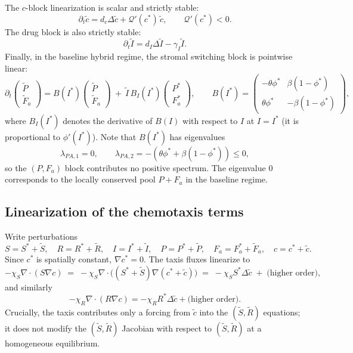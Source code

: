 \documentclass[pdflatex,sn-mathphys-ay]{sn-jnl}
\theoremstyle{thmstyleone}
\theoremstyle{definition}
\theoremstyle{remark}
\begin{document}
\begin{appendices}
The $c$-block linearization is scalar and strictly stable:
\begin{equation}
\label{eq:c_block_appendix}
\partial_t \tilde c = d_c \Delta \tilde c + \mathcal Q'(c^*)\,\tilde c,
\qquad \mathcal Q'(c^*)<0.
\end{equation}
The drug block is also strictly stable:
\begin{equation}
\label{eq:I_block_appendix}
\partial_t \tilde I = d_I \Delta \tilde I - \gamma_I \tilde I.
\end{equation}
Finally, in the baseline hybrid regime, the stromal switching block is pointwise linear:
\begin{equation}
\label{eq:PA_block_appendix}
\partial_t
\begin{pmatrix}\tilde P\\ \tilde F_a\end{pmatrix}
=
B(I^*)
\begin{pmatrix}\tilde P\\ \tilde F_a\end{pmatrix}
\ +\ 
\tilde I\,
B_I(I^*)
\begin{pmatrix}P^*\\ F_a^*\end{pmatrix},
\qquad
B(I^*)=
\begin{pmatrix}
-\theta\phi^* & \beta(1-\phi^*)\\
\theta\phi^* & -\beta(1-\phi^*)
\end{pmatrix},
\end{equation}
where $B_I(I^*)$ denotes the derivative of $B(I)$ with respect to $I$ at $I=I^*$ (it is proportional to $\phi'(I^*)$).  Note that $B(I^*)$ has eigenvalues
\begin{equation}
\label{eq:PA_eigs_appendix}
\lambda_{PA,1}=0,
\qquad
\lambda_{PA,2}=-(\theta\phi^*+\beta(1-\phi^*))\le 0,
\end{equation}
so the $(P,F_a)$ block contributes no positive spectrum.  The eigenvalue $0$ corresponds to the locally conserved pool $P+F_a$ in the baseline regime.

\subsection{Linearization of the chemotaxis terms}
Write perturbations
\[
S=S^*+\tilde S,\quad R=R^*+\tilde R,\quad I=I^*+\tilde I,\quad P=P^*+\tilde P,\quad F_a=F_a^*+\tilde F_a,\quad c=c^*+\tilde c.
\]
Since $c^*$ is spatially constant, $\nabla c^*=0$.  The taxis fluxes linearize to
\[
-\chi_S\nabla\!\cdot(S\nabla c) \;=\; -\chi_S\nabla\!\cdot\bigl((S^*+\tilde S)\nabla(c^*+\tilde c)\bigr)
\;=\; -\chi_S S^* \Delta \tilde c \;+\; \text{(higher order)},
\]
and similarly
\[
-\chi_R\nabla\!\cdot(R\nabla c)= -\chi_R R^* \Delta \tilde c + \text{(higher order)}.
\]
Crucially, the taxis contributes only a forcing from $\tilde c$ into the $(\tilde S,\tilde R)$ equations; it does not modify the $(\tilde S,\tilde R)$ Jacobian with respect to $(\tilde S,\tilde R)$ at a homogeneous equilibrium.


\end{appendices}
\end{document}
